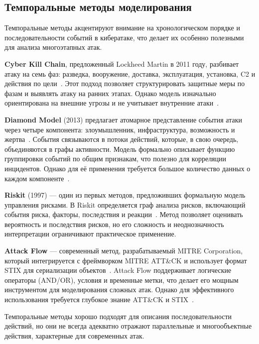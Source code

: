 \subsection{Темпоральные методы моделирования}

Темпоральные методы акцентируют внимание на хронологическом порядке и последовательности событий в кибератаке, что делает их особенно полезными для анализа многоэтапных атак.

\textbf{Cyber Kill Chain}, предложенный Lockheed Martin в 2011 году, разбивает атаку на семь фаз: разведка, вооружение, доставка, эксплуатация, установка, C2 и действия по цели~\cite{Neiman2024b}. Этот подход позволяет структурировать защитные меры по фазам и выявлять атаку на ранних этапах. Однако модель изначально ориентирована на внешние угрозы и не учитывает внутренние атаки~\cite{Neiman2024b}.

\textbf{Diamond Model} (2013) предлагает атомарное представление события атаки через четыре компонента: злоумышленник, инфраструктура, возможность и жертва~\cite{Neiman2024b}. События связываются в потоки действий, которые, в свою очередь, объединяются в графы активности. Модель формально описывает функцию группировки событий по общим признакам, что полезно для корреляции инцидентов. Однако для её применения требуется большое количество данных о каждом компоненте~\cite{Neiman2024b}.

\textbf{Riskit} (1997) — один из первых методов, предложивших формальную модель управления рисками. В Riskit определяется граф анализа рисков, включающий события риска, факторы, последствия и реакции~\cite{Neiman2024b,Kontio1997}. Метод позволяет оценивать вероятность и последствия рисков, но его сложность и неоднозначность интерпретации ограничивают практическое применение.

\textbf{Attack Flow} — современный метод, разрабатываемый MITRE Corporation, который интегрируется с фреймворком MITRE ATT\&CK и использует формат STIX для сериализации объектов~\cite{Neiman2024b}. Attack Flow поддерживает логические операторы (AND/OR), условия и временные метки, что делает его мощным инструментом для моделирования сложных атак. Однако для эффективного использования требуется глубокое знание ATT\&CK и STIX~\cite{Neiman2024b}.

Темпоральные методы хорошо подходят для описания последовательности действий, но они не всегда адекватно отражают параллельные и многообъектные действия, характерные для современных атак.

